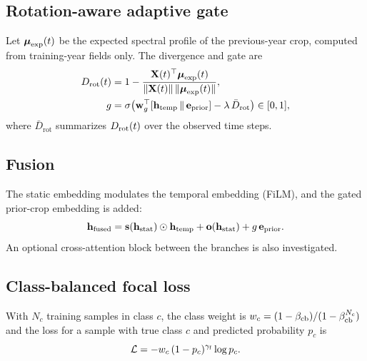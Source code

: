 \subsection{Rotation-aware adaptive gate}
Let $\boldsymbol{\mu}_{\mathrm{exp}}(t)$ be the expected spectral profile of the previous-year crop, computed from training-year fields only. The divergence and gate are
\begin{align}
D_{\mathrm{rot}}(t) &= 1-\frac{\mathbf{X}(t)^{\top}\boldsymbol{\mu}_{\mathrm{exp}}(t)}{\lVert\mathbf{X}(t)\rVert\,\lVert\boldsymbol{\mu}_{\mathrm{exp}}(t)\rVert},\\
g &= \sigma\!\left(\mathbf{w}_g^{\top}[\mathbf{h}_{\mathrm{temp}}\,\|\,\mathbf{e}_{\mathrm{prior}}]-\lambda\,\bar{D}_{\mathrm{rot}}\right)\in[0,1],
\end{align}
where $\bar{D}_{\mathrm{rot}}$ summarizes $D_{\mathrm{rot}}(t)$ over the observed time steps. 

\subsection{Fusion}
The static embedding modulates the temporal embedding (FiLM), and the gated prior-crop embedding is added:
\begin{equation}
\mathbf{h}_{\mathrm{fused}}=\mathbf{s}(\mathbf{h}_{\mathrm{stat}})\odot\mathbf{h}_{\mathrm{temp}}+\mathbf{o}(\mathbf{h}_{\mathrm{stat}})+g\,\mathbf{e}_{\mathrm{prior}} .
\label{eq:fusion}
\end{equation}
An optional cross-attention block between the branches is also investigated. 

\subsection{Class-balanced focal loss}
With $N_c$ training samples in class $c$, the class weight is $w_c=(1-\beta_{\mathrm{cb}})/(1-\beta_{\mathrm{cb}}^{N_c})$ and the loss for a sample with true class $c$ and predicted probability $p_c$ is
\begin{equation}
\mathcal{L}=-w_c\,(1-p_c)^{\gamma_{\mathrm{f}}}\log p_c .
\end{equation}
